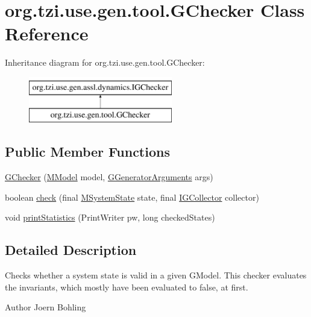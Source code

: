 \hypertarget{classorg_1_1tzi_1_1use_1_1gen_1_1tool_1_1_g_checker}{\section{org.\-tzi.\-use.\-gen.\-tool.\-G\-Checker Class Reference}
\label{classorg_1_1tzi_1_1use_1_1gen_1_1tool_1_1_g_checker}
}
Inheritance diagram for org.\-tzi.\-use.\-gen.\-tool.\-G\-Checker\-:\begin{figure}[H]
\begin{center}
\leavevmode
\includegraphics[height=2.000000cm]{classorg_1_1tzi_1_1use_1_1gen_1_1tool_1_1_g_checker}
\end{center}
\end{figure}
\subsection*{Public Member Functions}
\begin{DoxyCompactItemize}
\item 
\hyperlink{classorg_1_1tzi_1_1use_1_1gen_1_1tool_1_1_g_checker_a52cf451cb7a6626cb36c8fb7fbf6dbe8}{G\-Checker} (\hyperlink{classorg_1_1tzi_1_1use_1_1uml_1_1mm_1_1_m_model}{M\-Model} model, \hyperlink{classorg_1_1tzi_1_1use_1_1gen_1_1tool_1_1_g_generator_arguments}{G\-Generator\-Arguments} args)
\item 
boolean \hyperlink{classorg_1_1tzi_1_1use_1_1gen_1_1tool_1_1_g_checker_a1b3bca6c9beea7629051b6c8171a4160}{check} (final \hyperlink{classorg_1_1tzi_1_1use_1_1uml_1_1sys_1_1_m_system_state}{M\-System\-State} state, final \hyperlink{interfaceorg_1_1tzi_1_1use_1_1gen_1_1assl_1_1dynamics_1_1_i_g_collector}{I\-G\-Collector} collector)
\item 
void \hyperlink{classorg_1_1tzi_1_1use_1_1gen_1_1tool_1_1_g_checker_ab493c3b9244f82e8ad649d921dc10ff4}{print\-Statistics} (Print\-Writer pw, long checked\-States)
\end{DoxyCompactItemize}


\subsection{Detailed Description}
Checks whether a system state is valid in a given {\ttfamily G\-Model}. This checker evaluates the invariants, which mostly have been evaluated to false, at first. \begin{DoxyAuthor}{Author}
Joern Bohling 
\end{DoxyAuthor}


